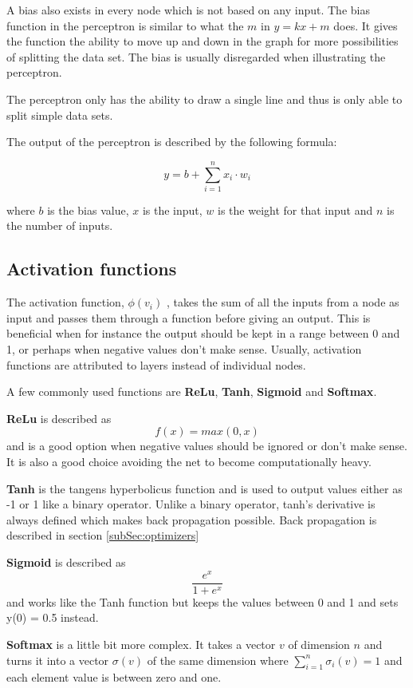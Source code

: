 A bias also exists in every node which is not based on any input. The bias function in the perceptron is similar to what the $m$ in $y = kx + m$ does. It gives the function the ability to move up and down in the graph for more possibilities of splitting the data set. The bias is usually disregarded when illustrating the perceptron.

The perceptron only has the ability to draw a single line and thus is only able to split simple data sets.

The output of the perceptron is described by the following formula:

\[ y = b + \displaystyle\sum_{i=1}^{n} x_i \cdot w_i \]

where $b$ is the bias value, $x$ is the input, $w$ is the weight for that input and $n$ is the number of inputs.

\subsection{Activation functions}
\label{subsec:activationfunctions}
The activation function,  $ \phi (v_{i}) $ , takes the sum of all the inputs from a node as input and passes them through a function before giving an output. This is beneficial when for instance the output should be kept in a range between 0 and 1, or perhaps when negative values don't make sense.
Usually, activation functions are attributed to layers instead of individual nodes.

A few commonly used functions are \textbf{ReLu}, \textbf{Tanh}, \textbf{Sigmoid} and \textbf{Softmax}.

\textbf{ReLu} is described as
\[f(x) = max(0, x)\]
and is a good option when negative values should be ignored or don't make sense. 
It is also a good choice avoiding the net to become computationally heavy.

\textbf{Tanh} is the tangens hyperbolicus function and is used to output values either as -1 or 1 like a binary operator. Unlike a binary operator, tanh's derivative is always defined which makes back propagation possible.
Back propagation is described in section \ref{subSec:optimizers}

\textbf{Sigmoid} is described as 
\[\frac{e^x}{1+e^x}\]
and works like the Tanh function but keeps the values between 0 and 1 and sets y(0) = 0.5 instead.

\textbf{Softmax} is a little bit more complex. It takes a vector $v$ of dimension $n$ and turns it into a vector $\sigma(v)$ of the same dimension where $\displaystyle\sum_{i=1}^{n} \sigma_i(v) = 1 $ and each element value is between zero and one.

